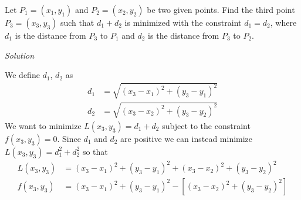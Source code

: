 \documentclass{article}
\begin{document}
  \indent Let $P_1 = (x_1, y_1)$ and $P_2 = (x_2, y_2)$ be two given points. \newline
  Find the third point $P_3 = (x_3, y_3)$ such that $d_1 + d_2$ is minimized with the
  constraint $d_1 = d_2$, where $d_1$ is the distance from $P_3$ to $P_1$ and $d_2$ is
  the distance from $P_3$ to $P_2$. \newline \newline

  \noindent \textit{Solution} \newline
  
  \noindent We define $d_1$, $d_2$ as 
  \begin{align*}
    d_1 &= \sqrt{(x_3 - x_1)^2 + (y_3-y_1)^2} \tag{3.1} \\
    d_2 &= \sqrt{(x_3 - x_2)^2 + (y_3-y_2)^2} \tag{3.2} 
  \end{align*}
  We want to minimize $L(x_3, y_3)=d_1+d_2$ subject to the constraint $f(x_3, y_3) = 0$.
  Since $d_1$ and $d_2$ are positive we can instead minimize $L(x_3, y_3)=d_1^2+d_2^2$ so that
  \begin{align*}
    L(x_3, y_3) &= (x_3 - x_1)^2 + (y_3-y_1)^2 + (x_3 - x_2)^2 + (y_3-y_2)^2 \tag{3.3} \\
    f(x_3, y_3) &= (x_3 - x_1)^2 + (y_3-y_1)^2 - [(x_3 - x_2)^2 + (y_3-y_2)^2] \tag{3.4} 
  \end{align*}
\end{document}

